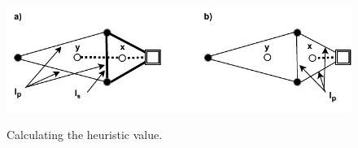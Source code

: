 \begin{figure}[h]
	\begin{centering}
		{\includegraphics[scale=0.9]{figures/approach/heuristic.pdf}}
		\caption{Calculating the heuristic value.}
		\label{fig:heuristic}
	\end{centering}
\end{figure}
